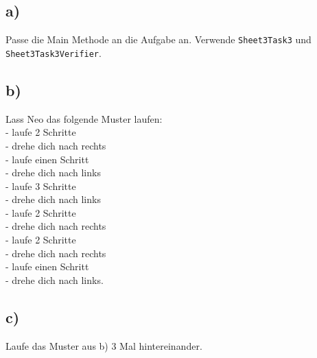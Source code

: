 \subsection*{a)}
	Passe die Main Methode an die Aufgabe an. Verwende \lstinline{Sheet3Task3} und \lstinline{Sheet3Task3Verifier}.
\subsection*{b)}
	Lass Neo das folgende Muster laufen:\\
	- laufe 2 Schritte\\
	- drehe dich nach rechts\\
	- laufe einen Schritt\\
	- drehe dich nach links\\
	- laufe 3 Schritte\\
	- drehe dich nach links\\
	- laufe 2 Schritte\\
	- drehe dich nach rechts\\
	- laufe 2 Schritte\\
	- drehe dich nach rechts\\
	- laufe einen Schritt\\
	- drehe dich nach links.
\subsection*{c)}
	Laufe das Muster aus b) 3 Mal hintereinander.
